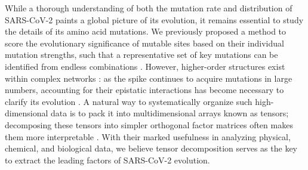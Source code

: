 \documentclass[%
 reprint,
superscriptaddress,
 amsmath,amssymb,
 aps,
]{revtex4-2}
\begin{document}
While a thorough understanding of both the mutation rate and distribution of SARS-CoV-2 paints a global picture of its evolution, it remains essential to study the details of its amino acid mutations. We previously proposed a method to score the evolutionary significance of mutable sites based on their individual mutation strengths, such that a representative set of key mutations can be identified from endless combinations \cite{Hasan2024}. However, higher-order structures exist within complex networks \cite{doi:10.1126/science.aad9029}: as the spike continues to acquire mutations in large numbers, accounting for their epistatic interactions has become necessary to clarify its evolution \cite{Starr2022Science}. A natural way to systematically organize such high-dimensional data is to pack it into multidimensional arrays known as tensors; decomposing these tensors into simpler orthogonal factor matrices often makes them more interpretable \cite{doi:10.1137/07070111X, 10.1146/annurev-statistics-042720-020816, 10.1146/annurev-statistics-112723-034548}. With their marked usefulness in analyzing physical, chemical, and biological data, we believe tensor decomposition serves as the key to extract the leading factors of SARS-CoV-2 evolution.

\end{document}
